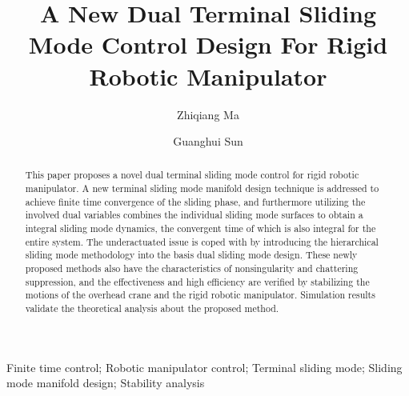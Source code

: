 \documentclass[3p]{elsarticle}
\theoremstyle{plain}
\theoremstyle{remark}
\begin{document}
\begin{frontmatter}
\title{A New Dual Terminal Sliding Mode Control Design For Rigid Robotic Manipulator}
\author{Zhiqiang Ma}
\author{Guanghui Sun}
\address{Research Institute of Intelligent Control and Systems, Harbin Institute of Technology, Harbin 150001, China}

\begin{abstract}
This paper proposes a novel dual terminal sliding mode control for rigid robotic manipulator. A new terminal sliding mode manifold design technique is addressed to achieve finite time convergence of the sliding phase, and furthermore utilizing the involved dual variables combines the individual sliding mode surfaces to obtain a integral sliding mode dynamics, the convergent time of which is also integral for the entire system. The underactuated issue is coped with by introducing the hierarchical sliding mode methodology into the basis dual sliding mode design. These newly proposed methods also have the characteristics of nonsingularity and chattering suppression, and the effectiveness and high efficiency are verified by stabilizing the motions of the overhead crane and the rigid robotic manipulator. Simulation results validate the theoretical analysis about the proposed method.
\end{abstract}
\begin{keyword}
Finite time control; Robotic manipulator control; Terminal sliding mode; Sliding mode manifold design; Stability analysis
\end{keyword}
\end{frontmatter}
\end{document}
